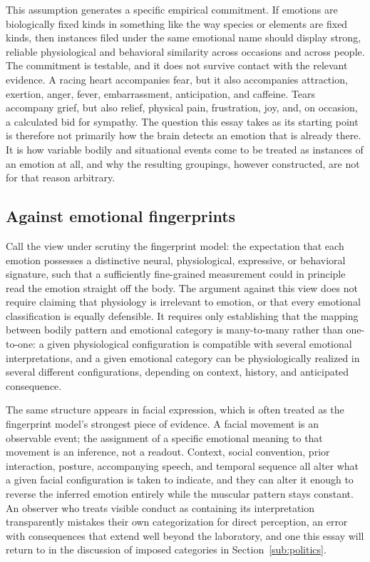 \documentclass[11pt]{article}
\begin{document}
This assumption generates a specific empirical commitment. If emotions are biologically fixed kinds in something like the way species or elements are fixed kinds, then instances filed under the same emotional name should display strong, reliable physiological and behavioral similarity across occasions and across people. The commitment is testable, and it does not survive contact with the relevant evidence. A racing heart accompanies fear, but it also accompanies attraction, exertion, anger, fever, embarrassment, anticipation, and caffeine. Tears accompany grief, but also relief, physical pain, frustration, joy, and, on occasion, a calculated bid for sympathy. The question this essay takes as its starting point is therefore not primarily how the brain detects an emotion that is already there. It is how variable bodily and situational events come to be treated as instances of an emotion at all, and why the resulting groupings, however constructed, are not for that reason arbitrary.

\subsection{Against emotional fingerprints}\label{sub:fingerprints}

Call the view under scrutiny the fingerprint model: the expectation that each emotion possesses a distinctive neural, physiological, expressive, or behavioral signature, such that a sufficiently fine-grained measurement could in principle read the emotion straight off the body. The argument against this view does not require claiming that physiology is irrelevant to emotion, or that every emotional classification is equally defensible. It requires only establishing that the mapping between bodily pattern and emotional category is many-to-many rather than one-to-one: a given physiological configuration is compatible with several emotional interpretations, and a given emotional category can be physiologically realized in several different configurations, depending on context, history, and anticipated consequence.

The same structure appears in facial expression, which is often treated as the fingerprint model's strongest piece of evidence. A facial movement is an observable event; the assignment of a specific emotional meaning to that movement is an inference, not a readout. Context, social convention, prior interaction, posture, accompanying speech, and temporal sequence all alter what a given facial configuration is taken to indicate, and they can alter it enough to reverse the inferred emotion entirely while the muscular pattern stays constant. An observer who treats visible conduct as containing its interpretation transparently mistakes their own categorization for direct perception, an error with consequences that extend well beyond the laboratory, and one this essay will return to in the discussion of imposed categories in Section~\ref{sub:politics}.
\end{document}
